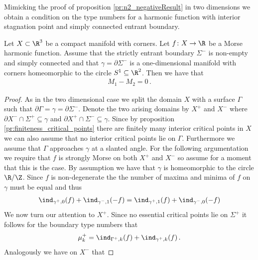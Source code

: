 Mimicking the proof of proposition \ref{pr:n2_negativeResult} in two dimensions we obtain a condition on the type numbers for a harmonic function with interior
stagnation point and simply connected entrant boundary.
\begin{proposition}\label{pr:n3_inflowOutflowRels}
  Let $X\subset\R^3$ be a compact manifold with corners.
  Let $f\colon X\to\R$ be a Morse harmonic function. Assume that the strictly entrant boundary $\Sigma^-$ is non-empty and simply connected
  and that $\gamma=\partial\Sigma^-$ is a one-dimensional manifold with corners homeomorphic to the circle $S^1\subseteq\R^2$.
  Then we have that
  \begin{align*}
    M_1-M_2=0\,.
  \end{align*}
\end{proposition}
\begin{proof}
  As in the two dimensional case we split the domain $X$ with a surface $\Gamma$ such that
  $\partial\Gamma=\gamma=\partial\Sigma^-$.
  Denote the two arising domains by $X^+$ and $X^-$ where $\partial X^-\cap\Sigma^+\subseteq\gamma$ and
  $\partial X^+\cap \Sigma^-\subseteq\gamma$.
  Since by proposition \ref{pr:finiteness_critical_points} there are finitely many interior critical points in $X$
  we can also assume that no interior critical points lie on $\Gamma$.
  Furthermore we assume that $\Gamma$ approaches $\gamma$ at a slanted angle.
  For the following argumentation we require that $f$ is strongly Morse on both $X^+$ and
  $X^-$ so assume for a moment that this is the case.
  By assumption we have that $\gamma$ is homeomorphic to the circle $\R/\Z$.
  Since $f$ is non-degenerate the
  the number of maxima and minima of $f$ on $\gamma$ must be equal and thus
  \begin{align}
    \ind_{\gamma^+,0}(f)+\ind_{\gamma^-,1}(-f)=\ind_{\gamma^+,1}(f)+\ind_{\gamma^-,0}(-f)
    \label{eq:n3_disproof_morse_maxMinRel}
  \end{align}
  We now turn our attention to $X^+$. Since no essential critical points lie on $\Sigma^+$ 
  it follows for the boundary type numbers that
  \begin{align}
    \mu^+_k=\ind_{\Gamma^+, k}(f)+\ind_{\gamma^+,k}(f)\,.\label{eq:n3_disproof_morse_muplus}
  \end{align}
  Analogously we have on $X^-$ that

\end{proof}
